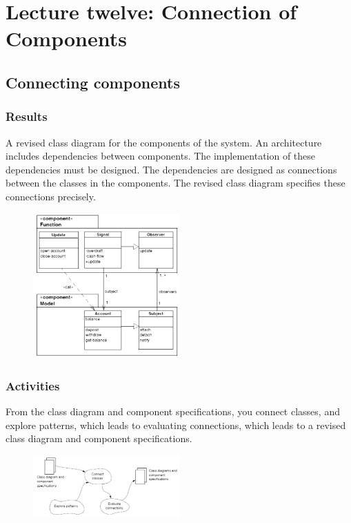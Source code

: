 \setcounter{chapter}{11}
\chapter{Lecture twelve: Connection of Components}
\section{Connecting components}
\subsection{Results}
A revised class diagram for the components of the system. An architecture includes dependencies between components. The implementation of these dependencies must be designed. The dependencies are designed as connections between the classes in the components. The revised class diagram specifies these connections precisely. 
\begin{figure}[H]
    \centering
    \includegraphics[width=0.5\textwidth]{figures/connectingcomponentsresult.png}
\end{figure}

\subsection{Activities}
From the class diagram and component specifications, you connect classes, and explore patterns, which leads to evaluating connections, which leads to a revised class diagram and component specifications.

\begin{figure}[H]
    \centering
    \includegraphics[width=0.5\textwidth]{figures/connectingcomponentsactivities.png}
\end{figure}

